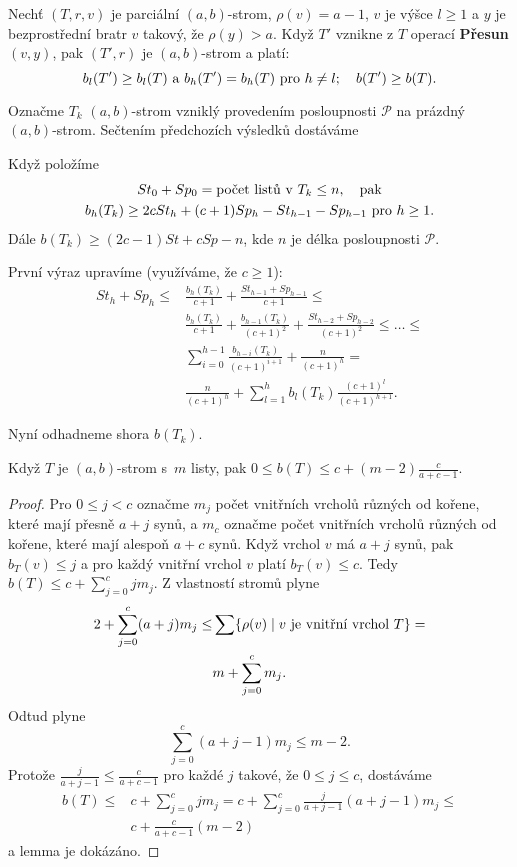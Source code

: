 \documentclass[a4paper,12pt]{article}
\begin{document}
\begin{lemma_counting} Nechť $(T,r,v)$ je parciální $(a,b)$-strom, 
$\rho (v)=a-1$, $v$ je výšce $l\ge 1$ a $y$ je bezprostřední bratr $v$ takový, že $\rho(y)>a$. 
Když $T'$ vznikne z $T$ operací {\bf Přesun$(v,y)$}, 
pak $(T',r)$ je $(a,b)$-strom a platí:  
$$b_l(T')\ge b_l(T)\text{\rm\ a }b_h(T')=b_h(T)\text{\rm\ pro }h\ne 
l;\quad b(T')\ge b(T).$$
\end{lemma_counting}

Označme $T_k$ $(a,b)$-strom vzniklý provedením posloupnosti 
$\mathcal P$ na prázdný $(a,b)$-strom. Sečtením předchozích 
výsledků dostá\-váme

\begin{dusledek_counting}Když položíme 
\begin{gather*} St_0+Sp_0=\text{\rm počet listů v }T_k\le n
,\quad\text{\rm pak}\\
b_h(T_k)\ge 2cSt_h+(c+1)Sp_h-St_{h-1}-Sp_{h-1}\text{\rm\ pro }h\ge 
1.\end{gather*}
Dále $b(T_k)\ge (2c-1)St+cSp-n$, kde $n$ je délka posloupnosti $
\mathcal P$.
\end{dusledek_counting}

První výraz upravíme (využíváme, že $
c\ge 1$):
\begin{align*} St_h+Sp_h\le&\frac {b_h(T_k)}{c+1}+\frac {St_{h-1}+Sp_{h
-1}}{c+1}\le\\
&\frac {b_h(T_k)}{c+1}+\frac {b_{h-1}(T_k)}{(c+1)^2}+\frac {St_{h
-2}+Sp_{h-2}}{(c+1)^2}\le\dots\le\\
&\sum_{i=0}^{h-1}\frac {b_{h-i}(T_k)}{(c+1)^{i+1}}+\frac n{(c+1)^
h}=\\
&\frac n{(c+1)^h}+\sum_{l=1}^hb_l(T_k)\frac {(c+1)^l}{(c+1)^{h+1}}
.\end{align*}

Nyní odhadneme shora $b(T_k)$.

\begin{lemma_counting}Když $T$ je $(a,b)$-strom s~$m$ listy, pak 
$0\le b(T)\le c+(m-2)\frac c{a+c-1}$.
\end{lemma_counting}

\begin{proof}Pro $0\le j<c$ označme $m_j$ počet 
vnitřních vrcholů různých od kořene, 
které mají přesně $a+j$ synů, a $m_c$ označme 
počet vnitřních vrcholů různých od 
kořene, které mají alespoň $a+c$ synů. Když 
vrchol $v$ má $a+j$ synů, pak $b_T(v)\le j$ a pro 
každý vnitřní vrchol $v$ platí $b_T(v)\le c$. Tedy 
$b(T)\le c+\sum_{j=0}^cjm_j$. Z vlastností stromů plyne 
\begin{align*}2+\sum_{j=0}^c(a+j)m_j\le&\sum \{\rho (v)\mid v\text{\rm\ je vnitřní vrchol }
T\}=\\
&m+\sum_{j=0}^cm_j.\end{align*}
Odtud plyne
$$\sum_{j=0}^c(a+j-1)m_j\le m-2.$$
Protože $\frac j{a+j-1}\le\frac c{a+c-1}$ pro každé $j$ takové, že $
0\le j\le c$, 
dostáváme
\begin{align*} b(T)\le&c+\sum_{j=0}^cjm_j=c+\sum_{j=0}^c\frac j{a+j-1}(
a+j-1)m_j\le\\
&c+\frac c{a+c-1}(m-2)\end{align*}
a lemma je dokázáno.
\end{proof}
\end{document}
